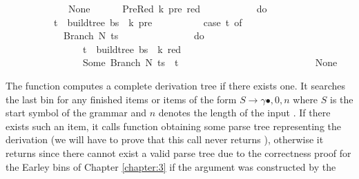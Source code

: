 \begin{isabellebody}
\ \ \ \ \ \ \ \ \ \ {\isacharbar}{\kern0pt}\ {\isacharunderscore}{\kern0pt}\ {\isasymRightarrow}\ None\ {\isacharbraceright}{\kern0pt}{\isacharparenright}{\kern0pt}\isanewline
\ \ \ \ {\isacharbar}{\kern0pt}\ PreRed\ {\isacharparenleft}{\kern0pt}k{\isacharprime}{\kern0pt}{\isacharcomma}{\kern0pt}\ pre{\isacharcomma}{\kern0pt}\ red{\isacharparenright}{\kern0pt}\ {\isacharunderscore}{\kern0pt}\ {\isasymRightarrow}\ {\isacharparenleft}{\kern0pt}\isanewline
\ \ \ \ \ \ \ \ do\ {\isacharbraceleft}{\kern0pt}\isanewline
\ \ \ \ \ \ \ \ \ \ t\ {\isasymleftarrow}\ build{\isacharunderscore}{\kern0pt}tree{\isacharprime}{\kern0pt}\ bs\ {\isasymomega}\ k{\isacharprime}{\kern0pt}\ pre{\isacharsemicolon}{\kern0pt}\isanewline
\ \ \ \ \ \ \ \ \ \ case\ t\ of\isanewline
\ \ \ \ \ \ \ \ \ \ \ \ Branch\ N\ ts\ {\isasymRightarrow}\isanewline
\ \ \ \ \ \ \ \ \ \ \ \ \ \ do\ {\isacharbraceleft}{\kern0pt}\isanewline
\ \ \ \ \ \ \ \ \ \ \ \ \ \ \ \ t\ {\isasymleftarrow}\ build{\isacharunderscore}{\kern0pt}tree{\isacharprime}{\kern0pt}\ bs\ {\isasymomega}\ k\ red{\isacharsemicolon}{\kern0pt}\isanewline
\ \ \ \ \ \ \ \ \ \ \ \ \ \ \ \ Some\ {\isacharparenleft}{\kern0pt}Branch\ N\ {\isacharparenleft}{\kern0pt}ts\ {\isacharat}{\kern0pt}\ {\isacharbrackleft}{\kern0pt}t{\isacharbrackright}{\kern0pt}{\isacharparenright}{\kern0pt}{\isacharparenright}{\kern0pt}\isanewline
\ \ \ \ \ \ \ \ \ \ \ \ \ \ {\isacharbraceright}{\kern0pt}\isanewline
\ \ \ \ \ \ \ \ \ \ {\isacharbar}{\kern0pt}\ {\isacharunderscore}{\kern0pt}\ {\isasymRightarrow}\ None\ {\isacharbraceright}{\kern0pt}{\isacharparenright}{\kern0pt}{\isacharparenright}{\kern0pt}{\isacharparenright}{\kern0pt}{\isachardoublequoteclose}%
\begin{isamarkuptext}%
The function  computes a complete derivation tree if there exists one. It searches the last bin for any finished items or items of the form
$S \rightarrow \gamma \bullet, 0, n$ where $S$ is the start symbol of the grammar \isa{{\isasymG}} and $n$ denotes
the length of the input \isa{{\isasymomega}}. If there exists such an item, it calls function 
obtaining some parse tree representing the derivation  (we will have to prove that this call never returns ),
otherwise it returns  since there cannot exist a valid parse tree due to the correctness
proof for the Earley bins of Chapter \ref{chapter:3} if the argument  was constructed by the

\end{isamarkuptext}
\end{isabellebody}
